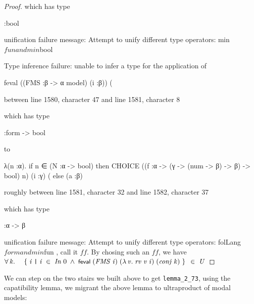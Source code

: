 \documentclass[letterpaper]{article}
\renewcommand{\HOLConst}[1]{{\textsf{\upshape\small #1}}}
\renewcommand{\HOLinline}[1]{\ensuremath{#1}}
\begin{document}
\begin{proof}
which has type

:bool

unification failure message: Attempt to unify different type operators: min$fun and min$bool

%
Type inference failure: unable to infer a type for the application of

feval ((FMS :β -> α model) (i :β)) (%

between line 1580, character 47 and line 1581, character 8

which has type

:form -> bool

to

λ(n :α).
    if n ∈ (N :α -> bool) then
      CHOICE ((f :α -> (γ -> (num -> β) -> β) -> bool) n) (i :γ)
        (%
    else (a :β)

roughly between line 1581, character 32 and line 1582, character 37

which has type

:α -> β

unification failure message: Attempt to unify different type operators: folLang$form and min$fun
, call it $ff$. By chosing such an $ff$, we have \HOLinline{\HOLSymConst{\HOLTokenForall{}}\HOLBoundVar{k}.\\
\;\;\;\;\HOLTokenLeftbrace{}\HOLBoundVar{i}\;\HOLTokenBar{}\;\HOLBoundVar{i}\;\HOLSymConst{\HOLTokenIn{}}\;\HOLFreeVar{In}\;\HOLNumLit{0}\;\HOLSymConst{\HOLTokenConj{}}\;\HOLConst{feval}\;(\HOLFreeVar{FMS}\;\HOLBoundVar{i})\;(\HOLTokenLambda{}\HOLBoundVar{v}.\;\HOLFreeVar{rv}\;\HOLBoundVar{v}\;\HOLBoundVar{i})\;(\HOLFreeVar{conj}\;\HOLBoundVar{k})\HOLTokenRightbrace{}\;\HOLSymConst{\HOLTokenIn{}}\;\HOLFreeVar{U}}

\end{proof}

We can step on the two stairs we built above to get \texttt{lemma_2_73}, using the capatibility lemma, we migrant the above lemma to ultraproduct of modal models:
\end{document}
